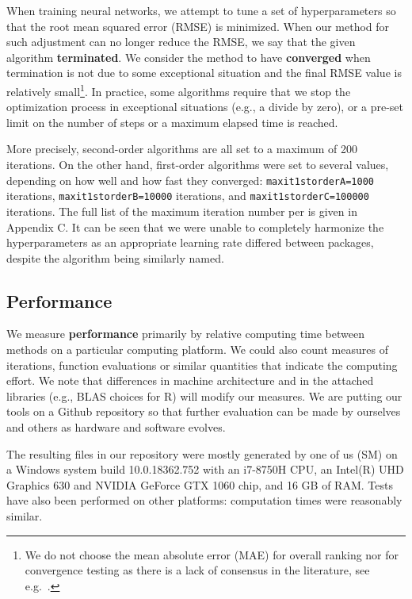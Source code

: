 When training neural networks, we attempt to tune a set of
hyperparameters so that the root mean squared error (RMSE) is minimized.
When our method for such adjustment can no longer reduce the RMSE, we
say that the given algorithm \textbf{terminated}. We consider the method
to have \textbf{converged} when termination is not due to some
exceptional situation and the final RMSE value is relatively
small\footnote{We do not choose the mean absolute error (MAE) for
  overall ranking nor for convergence testing as there is a lack of
  consensus in the literature, see
  e.g.~\citep{willmott2005advantages,chai2014root}.}. In practice, some
algorithms require that we stop the optimization process in exceptional
situations (e.g., a divide by zero), or a pre-set limit on the number of
steps or a maximum elapsed time is reached.

More precisely, second-order algorithms are all set to a maximum of 200
iterations. On the other hand, first-order algorithms were set to
several values, depending on how well and how fast they converged:
\texttt{maxit1storderA=1000} iterations, \texttt{maxit1storderB=10000}
iterations, and \texttt{maxit1storderC=100000} iterations. The full list
of the maximum iteration number per  is given in
Appendix C. It can be seen that we were unable to completely harmonize
the hyperparameters as an appropriate learning rate differed between
packages, despite the algorithm being similarly named.

\hypertarget{performance}{%
\subsection{Performance}\label{performance}}

We measure \textbf{performance} primarily by relative computing time
between methods on a particular computing platform. We could also count
measures of iterations, function evaluations or similar quantities that
indicate the computing effort. We note that differences in machine
architecture and in the attached libraries (e.g., BLAS choices for
\textsf{R}) will modify our measures. We are putting our tools on a
Github repository so that further evaluation can be made by ourselves
and others as hardware and software evolves.

The resulting files in our repository were mostly generated by one of us
(SM) on a Windows system build 10.0.18362.752 with an i7-8750H CPU, an
Intel(R) UHD Graphics 630 and NVIDIA GeForce GTX 1060 chip, and 16 GB of
RAM. Tests have also been performed on other platforms: computation
times were reasonably similar.


